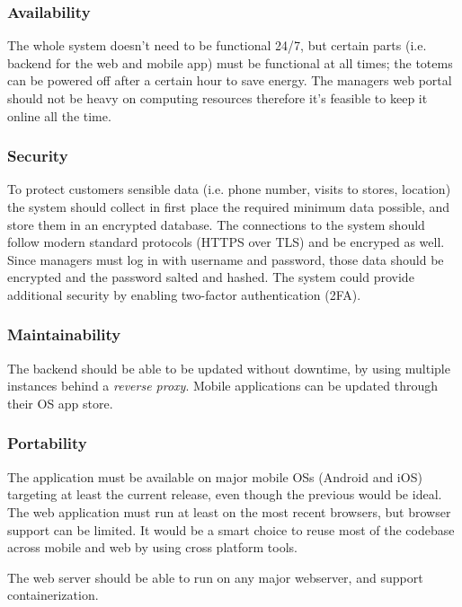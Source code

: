 \subsubsection{Availability}
The whole system doesn't need to be functional 24/7, but certain parts (i.e. backend for the web and mobile app) must be functional at all times; the totems can be powered off after a certain hour to save energy. The managers web portal should not be heavy on computing resources therefore it's feasible to keep it online all the time.
\subsubsection{Security}
To protect customers sensible data (i.e. phone number, visits to stores, location) the system should collect in first place the required minimum data possible, and store them in an encrypted database. The connections to the system should follow modern standard protocols (HTTPS over TLS) and be encryped as well. Since managers must log in with username and password, those data should be encrypted and the password salted and hashed. The system could provide additional security by enabling two-factor authentication  (2FA).

\subsubsection{Maintainability}
The backend should be able to be updated without downtime, by using multiple instances behind a \emph{reverse proxy}.
Mobile applications can be updated through their OS app store.

\subsubsection{Portability}
The application must be available on major mobile OSs (Android and iOS) targeting at least the current release, even though the previous would be ideal.
The web application must run at least on the most recent browsers, but browser support can be limited.
It would be a smart choice to reuse most of the codebase across mobile and web by using cross platform tools.

The web server should be able to run on any major webserver, and support containerization.